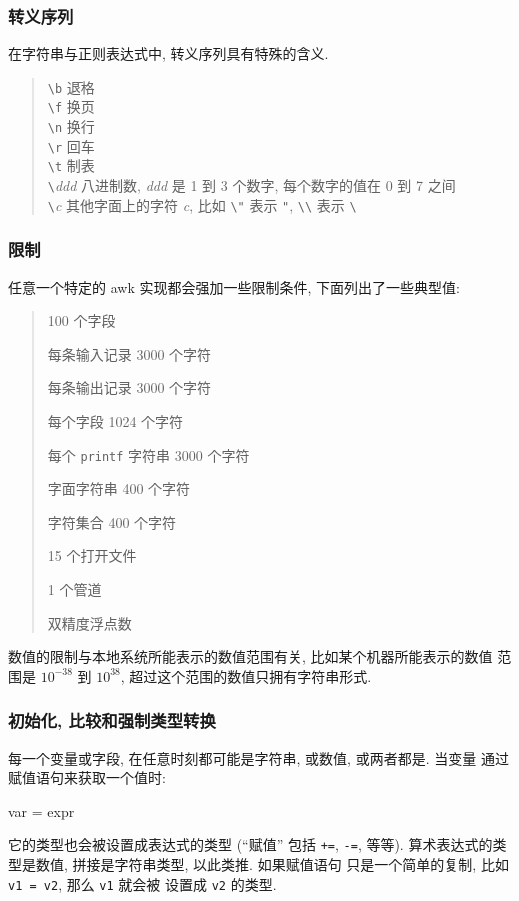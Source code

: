 \subsubsection{转义序列}
在字符串与正则表达式中, 转义序列具有特殊的含义.
\begin{quote}
    \begin{tabbing}
        \verb'\b' \hspace{4em} \= 退格 \\
        \verb'\f' \> 换页 \\
        \verb'\n' \> 换行 \\
        \verb'\r' \> 回车 \\
        \verb'\t' \> 制表 \\
        \verb'\'\textit{ddd} \> 八进制数, \textit{ddd} 是 1 到 3 个数字,
        每个数字的值在 0 到 7 之间 \\
        \verb'\'\textit{c} \> 其他字面上的字符 \textit{c}, 比如 \verb'\"'
        表示 \verb'"', \verb'\\' 表示 \verb'\' \\
    \end{tabbing}
\end{quote}

\subsubsection{限制}
任意一个特定的 awk 实现都会强加一些限制条件, 下面列出了一些典型值:
\begin{quote}
    100 个字段 \par
    每条输入记录 3000 个字符 \par
    每条输出记录 3000 个字符 \par
    每个字段 1024 个字符 \par
    每个 \texttt{printf} 字符串 3000 个字符 \par
    字面字符串 400 个字符 \par
    字符集合 400 个字符 \par
    15 个打开文件 \par
    1 个管道 \par
    双精度浮点数
\end{quote}
数值的限制与本地系统所能表示的数值范围有关, 比如某个机器所能表示的数值 
范围是 $10^{-38}$ 到  $10^{38}$, 超过这个范围的数值只拥有字符串形式.
\subsubsection{初始化, 比较和强制类型转换}
每一个变量或字段, 在任意时刻都可能是字符串, 或数值, 或两者都是. 当变量
通过赋值语句来获取一个值时:
\begin{awkcode}
    var = expr
\end{awkcode}
它的类型也会被设置成表达式的类型 (``赋值'' 包括 \texttt{+=}, \texttt{-=},
等等). 算术表达式的类型是数值, 拼接是字符串类型, 以此类推. 如果赋值语句
只是一个简单的复制, 比如 \texttt{v1 = v2}, 那么 \texttt{v1} 就会被
设置成 \texttt{v2} 的类型.

